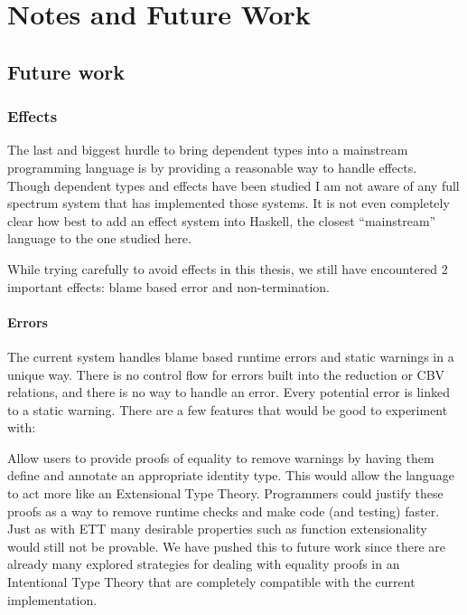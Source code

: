 \chapter{Notes and Future Work}
\label{chapter:Notes}
\thispagestyle{myheadings}



%  


\section{Future work}


\subsection{Effects}

The last and biggest hurdle to bring dependent types into a mainstream programming language is by providing a reasonable way to handle effects.
Though dependent types and effects have been studied I am not aware of any full spectrum system that has implemented those systems.
It is not even completely clear how best to add an effect system into Haskell, the closest ``mainstream'' language to the one studied here.

While trying carefully to avoid effects in this thesis, we still have encountered 2 important effects: blame based error and non-termination.

\subsubsection{Errors}

The current system handles blame based runtime errors and static warnings in a unique way.
There is no control flow for errors built into the reduction or CBV relations, and there is no way to handle an error.
Every potential error is linked to a static warning.
There are a few features that would be good to experiment with:

Allow users to provide proofs of equality to remove warnings by having them define and annotate an appropriate identity type.
This would allow the language to act more like an Extensional Type Theory.
Programmers could justify these proofs as a way to remove runtime checks and make code (and testing) faster.
Just as with \ac{ETT} many desirable properties such as function extensionality would still not be provable.
We have pushed this to future work since there are already many explored strategies for dealing with equality proofs in an Intentional Type Theory that are completely compatible with the current implementation.

